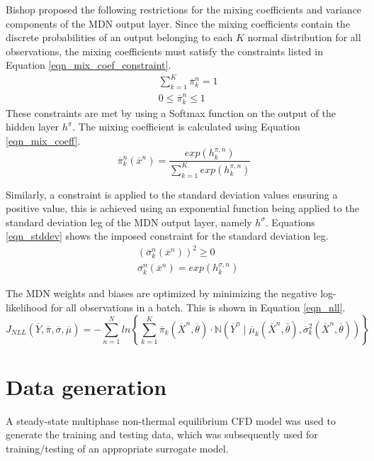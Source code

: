 \documentclass[a4paper,fleqn]{cas-sc}
\begin{document}
Bishop \cite{bishop1994} proposed the following restrictions for the mixing coefficients and variance components of the MDN output layer. Since the mixing coefficients contain the discrete probabilities of an output belonging to each $K$ normal distribution for all observations, the mixing coefficients must satisfy the constraints listed in Equation \ref{eqn_mix_coef_constraint}.
\begin{equation}\label{eqn_mix_coef_constraint}
\begin{split}
&\sum_{k=1}^K\overline{\pi}_k^n=1\\
&0\leq\overline{\pi}_k^n\leq1
\end{split}
\end{equation}
These constraints are met by using a Softmax function on the output of the hidden layer $h^{\pi}$. The mixing coefficient is calculated using Equation \ref{eqn_mix_coeff}.
\begin{equation}\label{eqn_mix_coeff}
\overline{\pi}_k^n(\overline{x}^n)=\frac{exp(h_k^{\pi,n})}{\sum_{k=1}^Kexp(h_k^{\pi,n})}
\end{equation}

Similarly, a constraint is applied to the standard deviation values ensuring a positive value, this is achieved using an exponential function being applied to the standard deviation leg of the MDN output layer, namely $h^{\sigma}$. Equations \ref{eqn_stddev} shows the imposed constraint for the standard deviation leg.\\
\begin{equation}\label{eqn_stddev}
\begin{split}
&(\overline{\sigma}^n_k(\overline{x}^n))^2\geq 0\\
&\sigma_k^n(\overline{x}^n)=exp(h_k^{\sigma,n})
\end{split}
\end{equation}

The MDN weights and biases are optimized by minimizing the negative log-likelihood for all observations in a batch. This is shown in Equation \ref{eqn_nll}.
\begin{equation}\label{eqn_nll}
J_{NLL}(\overline{Y},\overline{\pi},\overline{\sigma},\overline{\mu})=-\sum^N_{n=1}ln\left\{\sum^K_{k=1}\overline{\pi}_k(\overline{X}^n,\overline{\theta})\cdot \mathbb{N}(\overline{Y}^n\mid\overline{\mu}_k(\bar{X}^n,\bar{\theta}),\overline{\sigma}^2_k(\overline{X}^n,\overline{\theta})) \right\}
\end{equation}
\section{Data generation}
A steady-state multiphase non-thermal equilibrium CFD model was used to generate the training and testing data, which was subsequently used for training/testing of an appropriate surrogate model.
\end{document}
